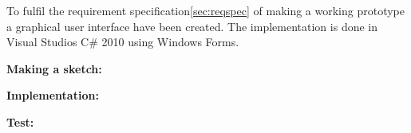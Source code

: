 To fulfil the requirement specification\ref{sec:reqspec} of making a working prototype a graphical user interface have been created. The implementation is done in Visual Studios C\# 2010 using Windows Forms.

\textbf{Making a sketch:}

\textbf{Implementation:}

\textbf{Test:}